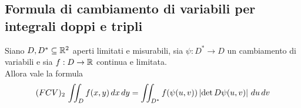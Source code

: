\subsection{Formula di cambiamento di variabili per integrali doppi e tripli}
\begin{theorem}
  Siano $D, D^* \subseteq \mathbb{R}^2$ aperti limitati e misurabili, sia $\psi : D^* \to D$
  un cambiamento di variabili e sia $f:D \to \mathbb{R}$ continua e limitata. \\
  Allora vale la formula
  $$(FCV)_2 \, \iint_{D} f(x,y) \,dx\,dy = \iint_{D^*} f(\psi(u,v))\left\lvert \det D\psi(u,v) \right\rvert \,du\,dv$$ 
\end{theorem}